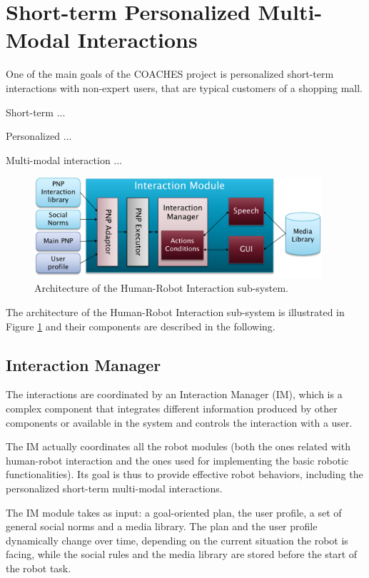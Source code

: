 \section{Short-term Personalized Multi-Modal Interactions}

One of the main goals of the COACHES project is personalized short-term interactions with non-expert users, that are typical customers of a shopping mall.

Short-term ...

Personalized ...

Multi-modal interaction ...



\begin{figure}
\centering
\includegraphics[width=0.95\textwidth]{fig/WP3.png}
\caption{Architecture of the Human-Robot Interaction sub-system.}
\label{fig:swarch}
\end{figure}

The architecture of the Human-Robot Interaction sub-system is illustrated in Figure \ref{fig:swarch} and their components are described in the following.

\subsection{Interaction Manager}

The interactions are coordinated by an Interaction Manager (IM), which is a complex component that integrates different information produced by other components or available in the system and controls the interaction with a user.

The IM actually coordinates all the robot modules (both the ones related with human-robot interaction and the ones used for implementing the basic robotic functionalities).
Its goal is thus to provide effective robot behaviors, including the personalized short-term multi-modal interactions.

The IM module takes as input: a goal-oriented plan, the user profile, a set of general social norms and a media library. The plan and the user profile dynamically change over time, depending on the current situation the robot is facing, while the social rules and the media library are stored before the start of the robot task.

